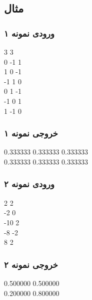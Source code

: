 \subsection*{مثال}
\subsubsection*{ورودی نمونه ۱}
\LTR
\begin{latin}
\begin{examplebox}
    3 3 \\
    0 -1 1 \\
    1 0 -1 \\
    -1 1 0 \\
    0 1 -1 \\ 
    -1 0 1 \\
    1 -1 0 
\end{examplebox}
\end{latin}
\RTL
\subsubsection*{خروجی نمونه ۱}
\LTR
\begin{latin}
\begin{examplebox}
    0.333333 0.333333 0.333333 \\
    0.333333 0.333333 0.333333
\end{examplebox}
\end{latin}
\RTL
\subsubsection*{ورودی نمونه ۲}
\LTR
\begin{latin}
\begin{examplebox}
    2  2 \\
   -2  0 \\
   -10 2 \\
   -8 -2 \\
    8  2
\end{examplebox}
\end{latin}
\RTL
\subsubsection*{خروجی نمونه ۲}
\LTR
\begin{latin}
\begin{examplebox}
    0.500000 0.500000 \\
    0.200000 0.800000
\end{examplebox}
\end{latin}
\RTL

